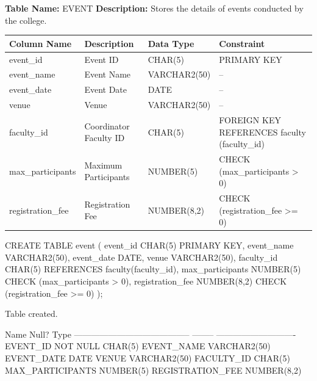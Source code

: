 
\textbf{Table Name:} EVENT \hspace{1em plus 1fill}
\textbf{Description:} Stores the details of events conducted by the college.

\vspace{8pt}

\renewcommand{\arraystretch}{1.4}
\begin{tabularx}{\textwidth}{|>{\raggedright\arraybackslash}X|>{\raggedright\arraybackslash}X|>{\raggedright\arraybackslash}X|>{\raggedright\arraybackslash}X|}
\hline
\textbf{Column Name} & \textbf{Description} & \textbf{Data Type} & \textbf{Constraint} \\
\hline
event\_id & Event ID & CHAR(5) & PRIMARY KEY \\
\hline
event\_name & Event Name & VARCHAR2(50) & -- \\
\hline
event\_date & Event Date & DATE & -- \\
\hline
venue & Venue & VARCHAR2(50) & -- \\
\hline
faculty\_id & Coordinator Faculty ID & CHAR(5) & FOREIGN KEY REFERENCES faculty (faculty\_id) \\
\hline
max\_participants & Maximum Participants & NUMBER(5) & CHECK (max\_participants > 0) \\
\hline
registration\_fee & Registration Fee & NUMBER(8,2) & CHECK (registration\_fee >= 0) \\
\hline
\end{tabularx}

\vspace{14pt}


\begin{sqlcode}
CREATE TABLE event (
    event_id         CHAR(5)       PRIMARY KEY,
    event_name       VARCHAR2(50),
    event_date       DATE,
    venue            VARCHAR2(50),
    faculty_id       CHAR(5)       REFERENCES faculty(faculty_id),
    max_participants NUMBER(5)     CHECK (max_participants > 0),
    registration_fee NUMBER(8,2)   CHECK (registration_fee >= 0)
);
\end{sqlcode}

\vspace{16pt}


\begin{sqlout}
Table created.

 Name                                      Null?    Type
 ----------------------------------------- -------- ----------------------------
 EVENT_ID                                  NOT NULL CHAR(5)
 EVENT_NAME                                         VARCHAR2(50)
 EVENT_DATE                                         DATE
 VENUE                                              VARCHAR2(50)
 FACULTY_ID                                         CHAR(5)
 MAX_PARTICIPANTS                                   NUMBER(5)
 REGISTRATION_FEE                                   NUMBER(8,2)
\end{sqlout}

\clearpage
